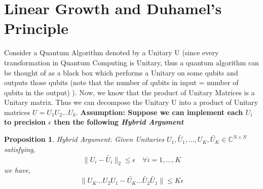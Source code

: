 \documentclass[12pt, oneside]{book}
\newtheorem{proposition}[theorem]{Proposition}
\theoremstyle{definition}
\theoremstyle{definition}
\theoremstyle{remark}
\begin{document}
\section{Linear Growth and Duhamel's Principle}
Consider a Quantum Algorithm denoted by a Unitary U (since every
transformation in Quantum Computing is Unitary, thus a quantum algorithm can be thought of as a black box
which performs a Unitary on some qubits and outputs those qubits (note that the number
of qubits in input = number of qubits in the output) ). Now,
we know that the product of Unitary Matrices is a Unitary matrix. Thus we
can decompose the Unitary U into a product of Unitary matrices $U=U_1U_2\ldots U_k$.
\textbf{Assumption: Suppose we can implement each $U_i$ to precision $\epsilon$ then the following \textit{Hybrid Argument}}
\begin{proposition}
    Hybrid Argument: Given Unitaries $U_1,\tilde{U_1},\ldots,U_K,\tilde{U_K} \in \mathbb{C}^{N \times N}$
    satisfying,
    \[\|U_i-\tilde{U_i}\|_2 \leq \epsilon \quad \forall i=1,\ldots,K\]
    we have,
    \[\|U_K\ldots U_2 U_1 - \tilde{U_K}\ldots \tilde{U_2}\tilde{U_1}\| \leq K\epsilon\]
\end{proposition}
\end{document}
